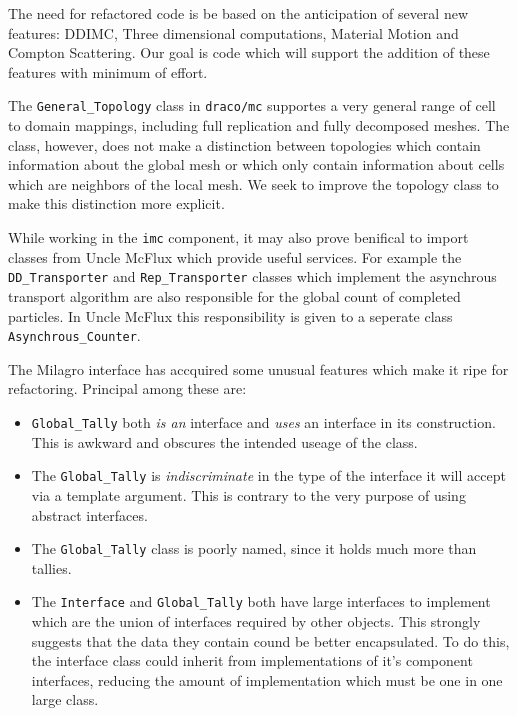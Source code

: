\documentclass[11pt]{nmemo}
\begin{document}
The need for refactored code is be based on the anticipation of
several new features: DDIMC, Three dimensional computations, Material
Motion and Compton Scattering. Our goal is code which will support the
addition of these features with minimum of effort.

The {\tt General\_Topology} class in {\tt draco/mc} supportes a very
general range of cell to domain mappings, including full replication
and fully decomposed meshes. The class, however, does not make a
distinction between topologies which contain information about the
global mesh or which only contain information about cells which are
neighbors of the local mesh. We seek to improve the topology class to
make this distinction more explicit.

While working in the {\tt imc} component, it may also prove benifical
to import classes from Uncle McFlux which provide useful services. For
example the {\tt DD\_Transporter} and {\tt Rep\_Transporter} classes
which implement the asynchrous transport algorithm are also
responsible for the global count of completed particles. In Uncle
McFlux this responsibility is given to a seperate class {\tt
  Asynchrous\_Counter}. 

The Milagro interface has accquired some unusual features which make
it ripe for refactoring. Principal among these are:

\begin{itemize}
\item {\tt Global\_Tally} both {\em is an} interface and {\em uses} an
  interface in its construction. This is awkward and obscures the
  intended useage of the class.

\item The {\tt Global\_Tally} is {\em indiscriminate} in the type of the
interface it will accept via a template argument. This is contrary to
the very purpose of using abstract interfaces.

\item The {\tt Global\_Tally} class is poorly named, since it holds much
more than tallies.

\item The {\tt Interface} and {\tt Global\_Tally} both have large
  interfaces to implement which are the union of interfaces required
  by other objects. This strongly suggests that the data they contain
  cound be better encapsulated. To do this, the interface class could
  inherit from implementations of it's component interfaces, reducing
  the amount of implementation which must be one in one large class.

\end{itemize}
\end{document}
